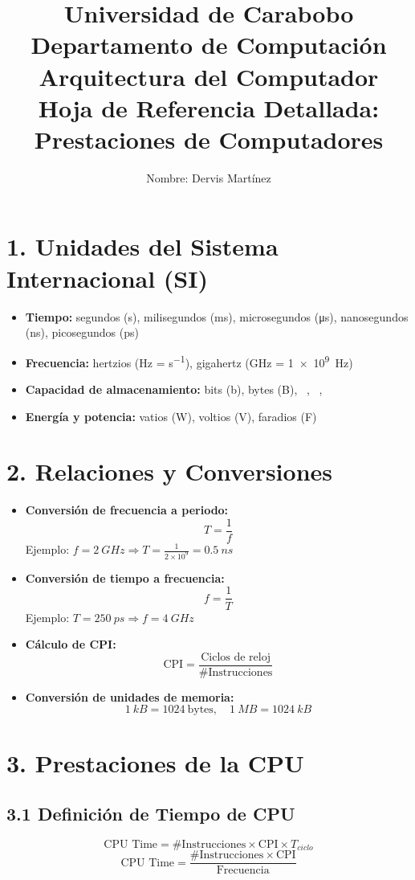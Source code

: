 \documentclass[12pt]{article}
\title{Universidad de Carabobo \\ Departamento de Computaci\'on \\ Arquitectura del Computador \\ \vspace{1em} \Huge Hoja de Referencia Detallada: Prestaciones de Computadores}
\author{Nombre: Dervis Mart\'inez}
\date{}
\begin{document}
\maketitle

\section*{1. Unidades del Sistema Internacional (SI)}
\begin{itemize}
  \item \textbf{Tiempo:} segundos (\si{s}), milisegundos (\si{ms}), microsegundos (\si{\micro s}), nanosegundos (\si{ns}), picosegundos (\si{ps})
  \item \textbf{Frecuencia:} hertzios (\si{Hz} = \si{s^{-1}}), gigahertz (\si{GHz} = \num{1e9}~\si{Hz})
  \item \textbf{Capacidad de almacenamiento:} bits (b), bytes (B), \si{\kilo\byte}, \si{\mega\byte}, \si{\giga\byte}
  \item \textbf{Energ\'ia y potencia:} vatios (\si{W}), voltios (\si{V}), faradios (\si{F})
\end{itemize}

\section*{2. Relaciones y Conversiones}
\begin{itemize}
  \item \textbf{Conversi\'on de frecuencia a periodo:} \
    \[ T = \frac{1}{f} \]
    Ejemplo: $f = \SI{2}{GHz} \Rightarrow T = \frac{1}{2 \times 10^9} = \SI{0.5}{ns}$

  \item \textbf{Conversi\'on de tiempo a frecuencia:} \
    \[ f = \frac{1}{T} \]
    Ejemplo: $T = \SI{250}{ps} \Rightarrow f = \SI{4}{GHz}$

  \item \textbf{C\'alculo de CPI:} \
    \[ \text{CPI} = \frac{\text{Ciclos de reloj}}{\# \text{Instrucciones}} \]

  \item \textbf{Conversi\'on de unidades de memoria:} \
    \[ \SI{1}{kB} = 1024~\text{bytes}, \quad \SI{1}{MB} = 1024~\si{kB} \]
\end{itemize}

\section*{3. Prestaciones de la CPU}
\subsection*{3.1 Definici\'on de Tiempo de CPU}
\[ \text{CPU Time} = \# \text{Instrucciones} \times \text{CPI} \times T_{ciclo} \]
\[ \text{CPU Time} = \frac{\# \text{Instrucciones} \times \text{CPI}}{\text{Frecuencia}} \]
\end{document}
